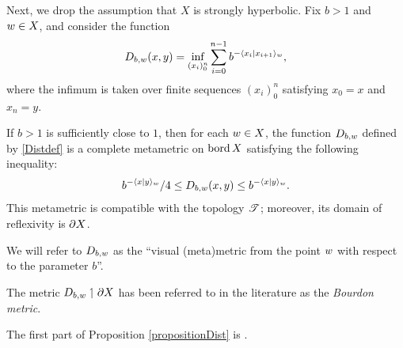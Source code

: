 Next, we drop the assumption that $X$ is strongly hyperbolic. Fix $b > 1$ and $w\in X$, and consider the function
\begin{equation}
\label{Distdef}
D_{b,w}(x,y) = \inf_{(x_i)_0^n} \sum_{i = 0}^{n - 1} b^{-\langle x_i | x_{i + 1}\rangle_w},
\end{equation}
where the infimum is taken over finite sequences $(x_i)_0^n$ satisfying $x_0 = x$ and $x_n = y$.

\begin{proposition}
\label{propositionDist}
If $b > 1$ is sufficiently close to $1$, then for each $w\in X$, the function $D_{b,w}$ defined by \eqref{Distdef} is a complete metametric on $\operatorname{bord} X$ satisfying the following inequality:
\begin{equation}
\label{distanceasymptotic}
b^{-\langle x|y\rangle_w} / 4 \leq D_{b,w}(x,y) \leq b^{-\langle x|y\rangle_w}.
\end{equation}
This metametric is compatible with the topology $\mathscr T$; moreover, its domain of reflexivity is $\partial X$.
\end{proposition}
We will refer to $D_{b,w}$ as the ``visual (meta)metric from the point $w$ with respect to the parameter $b$''.

\begin{remark}
The metric $D_{b,w}\upharpoonleft\partial X$ has been referred to in the literature as the \emph{Bourdon metric}.
\end{remark}

\begin{remark}
The first part of Proposition \ref{propositionDist} is \cite[Propositions 5.16 and 5.31]{Vaisala}.
\end{remark}

